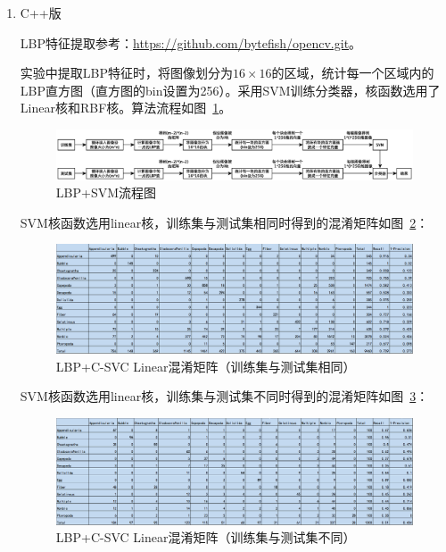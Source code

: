\documentclass[12pt]{article}
\begin{document}
\begin{enumerate}

\item C++版

LBP特征提取参考：\url{https://github.com/bytefish/opencv.git}。

实验中提取LBP特征时，将图像划分为$16 \times 16$的区域，统计每一个区域内的LBP直方图（直方图的bin设置为256）。采用SVM训练分类器，核函数选用了Linear核和RBF核。算法流程如图~\ref{fig:lbp}。

\begin{figure}[!ht]
\centering
\includegraphics[width=1.0\linewidth]{lbpChina}
\caption{LBP+SVM流程图}
\label{fig:lbp}
\end{figure}

SVM核函数选用linear核，训练集与测试集相同时得到的混淆矩阵如图~\ref{fig: Train-CM-LBP-SVM-linear}：
\begin{figure}[!ht]
\centering
\includegraphics[width=1.0\linewidth]{Train-CM-LBP-SVM-linear}
\caption{LBP+C-SVC Linear混淆矩阵（训练集与测试集相同）}
\label{fig: Train-CM-LBP-SVM-linear}
\end{figure}

SVM核函数选用linear核，训练集与测试集不同时得到的混淆矩阵如图~\ref{fig: Test-CM-LBP-SVM-linear}：
\begin{figure}[!ht]
\centering
\includegraphics[width=1.0\linewidth]{Test-CM-LBP-SVM-linear}
\caption{LBP+C-SVC Linear混淆矩阵（训练集与测试集不同）}
\label{fig: Test-CM-LBP-SVM-linear}
\end{figure}


\end{enumerate}
\end{document}
